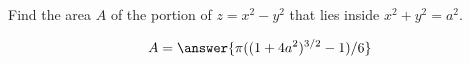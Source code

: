 \documentclass{ximera}
\author{David Guichard \and Neal Koblitz \and H. Jerome Keisler \and Albert Scheller \and Barry Balof \and Mike Wills \and Matthew Carr}
\begin{document}
\begin{exercise}




Find the area $A$ of the portion of $z=x^2-y^2$ that lies inside $x^2+y^2=a^2$.

\begin{prompt}
\[
A=\answer{\pi((1+4a^2)^{3/2}-1)/6}
\]
\end{prompt}


\end{exercise}
\end{document}
